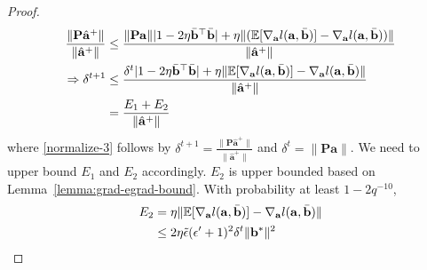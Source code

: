 \documentclass{article}
\theoremstyle{plain}
\theoremstyle{definition}
\theoremstyle{remark}
\begin{document}
\begin{proof}
\begin{align}
    \frac{\lVert\mathbf{P} \hat{\mathbf{a}}^{+}\rVert}{\lVert \hat{\mathbf{a}}^{+} \rVert} &\leq \frac{\lVert \mathbf{P}\mathbf{a}\rVert|1-2\eta \Bar{\mathbf{b}}^\top \Bar{\mathbf{b}}|+\eta \lVert (\mathbb{E}[\nabla_{\mathbf{a}}l(\mathbf{a},\Bar{\mathbf{b}})]-\nabla_{\mathbf{a}}l(\mathbf{a},\Bar{\mathbf{b}})) \rVert}{\lVert \hat{\mathbf{a}}^{+} \rVert} \label{normalize-2} \\
    \Rightarrow  \delta^{t+1}& \leq\frac{\delta^t|1-2\eta \Bar{\mathbf{b}}^\top \Bar{\mathbf{b}}|+ \eta  \lVert \mathbb{E}[\nabla_{\mathbf{a}}l(\mathbf{a},\Bar{\mathbf{b}})]-\nabla_{\mathbf{a}}l(\mathbf{a},\Bar{\mathbf{b}}) \rVert}{\lVert \hat{\mathbf{a}}^{+} \rVert} \label{normalize-3}\\
    & = \frac{E_1+E_2}{\lVert \hat{\mathbf{a}}^{+} \rVert}
\end{align}
where \eqref{normalize-3} follows by $\delta^{t+1} =   \frac{\lVert\mathbf{P} \hat{\mathbf{a}}^{+}\rVert}{\lVert \hat{\mathbf{a}}^{+} \rVert} $ and $\delta^t = \lVert \mathbf{P}\mathbf{a}\rVert$. We need to upper bound $E_1$ and $E_2$ accordingly. $E_2$ is upper bounded based on Lemma~\ref{lemma:grad-egrad-bound}. With probability at least $1-2q^{-10}$,
\begin{align}
    E_2 &= \eta  \lVert \mathbb{E}[\nabla_{\mathbf{a}}l(\mathbf{a},\Bar{\mathbf{b}})]-\nabla_{\mathbf{a}}l(\mathbf{a},\Bar{\mathbf{b}}) \rVert \\
    &\leq 2\eta \Tilde{\epsilon} (\epsilon'+1)^2\delta^t\lVert \mathbf{b}^*\rVert^2 \label{E2}
\end{align}


\end{proof}
\end{document}

